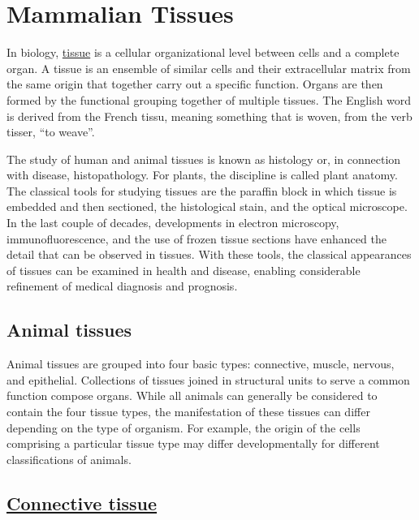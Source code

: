 \chapter{Mammalian Tissues}\label{mammalian-tissues}

In biology,
\href{https://en.wikipedia.org/wiki/Tissue_(biology)}{tissue} is a
cellular organizational level between cells and a complete organ. A
tissue is an ensemble of similar cells and their extracellular matrix
from the same origin that together carry out a specific function. Organs
are then formed by the functional grouping together of multiple tissues.
The English word is derived from the French tissu, meaning something
that is woven, from the verb tisser, ``to weave''.

The study of human and animal tissues is known as histology or, in
connection with disease, histopathology. For plants, the discipline is
called plant anatomy. The classical tools for studying tissues are the
paraffin block in which tissue is embedded and then sectioned, the
histological stain, and the optical microscope. In the last couple of
decades, developments in electron microscopy, immunofluorescence, and
the use of frozen tissue sections have enhanced the detail that can be
observed in tissues. With these tools, the classical appearances of
tissues can be examined in health and disease, enabling considerable
refinement of medical diagnosis and prognosis.

\section{Animal tissues}\label{animal-tissues}

Animal tissues are grouped into four basic types: connective, muscle,
nervous, and epithelial. Collections of tissues joined in structural
units to serve a common function compose organs. While all animals can
generally be considered to contain the four tissue types, the
manifestation of these tissues can differ depending on the type of
organism. For example, the origin of the cells comprising a particular
tissue type may differ developmentally for different classifications of
animals.

\section{\texorpdfstring{\href{https://en.wikipedia.org/wiki/Connective_tissue}{Connective
tissue}}{Connective tissue}}\label{connective-tissue}

